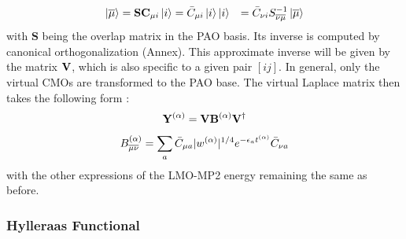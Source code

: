 \begin{align}
\ket{\overline{\mu}} &= \mathbf{SC}_{\mu i} \ket{i} = \bar{C}_{\mu i} \ket{i}
\ket{i} &= \bar{C}_{\nu i} S_{\overline{\nu}\overline{\mu}}^{-1} \ket{\overline{\mu}} 
\end{align}
\noindent with $\mathbf{S}$ being the overlap matrix in the PAO basis. Its inverse is computed by canonical orthogonalization (Annex). This approximate inverse will be given by the matrix $\mathbf{V}$, which is also specific to a given pair $[ij]$. In general, only the virtual CMOs are transformed to the PAO base. The virtual Laplace matrix then takes the following form \cite{Kat2008}:
\begin{equation}
\mathbf{Y}^{(\alpha)} = \mathbf{V} \mathbf{B}^{(\alpha)} \mathbf{V} ^{\dagger} 
\end{equation}
\begin{equation}
B_{\overline{\mu}\overline{\nu}}^{(\alpha)} = \sum_a \bar{C}_{\mu a} |w^{(\alpha)}|^{1/4} e^{-\epsilon_a t^{(\alpha)}} \bar{C}_{\nu a}
\end{equation}
\noindent with the other expressions of the LMO-MP2 energy remaining the same as before.


\subsubsection{Hylleraas Functional}

